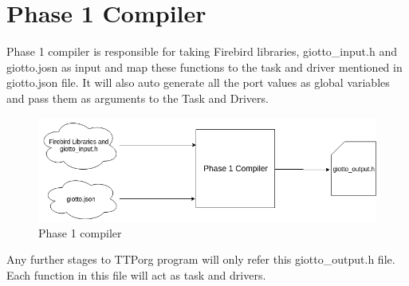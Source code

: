 \documentclass[16pt]{report}
\begin{document}
\chapter{Phase 1 Compiler}
Phase 1 compiler is responsible for taking Firebird libraries, giotto\_input.h and giotto.josn as input and map these functions to the task and driver mentioned in giotto.json file. It will also auto generate all the port values as global variables and pass them as arguments to the Task and Drivers.

\begin{figure}[H]
\centering
\includegraphics[width=\linewidth]{16phase1.png}
\caption{Phase 1 compiler}
\end{figure}

Any further stages to TTPorg program will only refer this giotto\_output.h file. Each function in this file will act as task and drivers.
\end{document}
